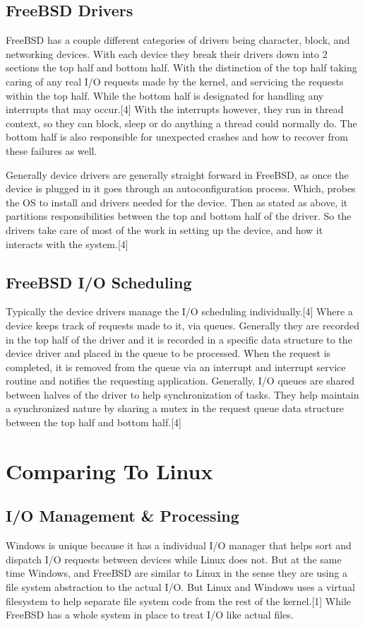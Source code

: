\documentclass[10pt,conference,draftclsnofoot,onecolumn]{IEEEtran}
\begin{document}
\subsection{FreeBSD Drivers}
FreeBSD has a couple different categories of drivers being character, block, and networking devices. With each device they break their drivers down into 2 sections the top half and bottom half. With the distinction of the top half taking caring of any real I/O requests made by the kernel, and servicing the requests within the top half. While the bottom half is designated for handling any interrupts that may occur.[4] With the interrupts however, they run in thread context, so they can block, sleep or do anything a thread could normally do. The bottom half is also responsible for unexpected crashes and how to recover from these failures as well.

Generally device drivers are generally straight forward in FreeBSD, as once the device is plugged in it goes through an autoconfiguration process. Which, probes the OS to install and drivers needed for the device. Then as stated as above, it partitions responsibilities between the top and bottom half of the driver. So the drivers take care of most of the work in setting up the device, and how it interacts with the system.[4]

\subsection{FreeBSD I/O Scheduling}
Typically the device drivers manage the I/O scheduling individually.[4] Where a device keeps track of requests made to it, via queues. Generally they are recorded in the top half of the driver and it is recorded in a specific data structure to the device driver and placed in the queue to be processed. When the request is completed, it is removed from the queue via an interrupt and interrupt service routine and notifies the requesting application. Generally, I/O queues are shared between halves of the driver to help synchronization of tasks. They help maintain a synchronized nature by sharing a mutex in the request queue data structure between the top half and bottom half.[4]

\section{Comparing To Linux}
\subsection{I/O Management \& Processing}
    Windows is unique because it has a individual I/O manager that helps sort and dispatch I/O requests between devices while Linux does not. But at the same time Windows, and  FreeBSD are similar to Linux in the sense they are using a file system abstraction to the actual I/O. But Linux and Windows uses a virtual filesystem to help separate file system code from the rest of the kernel.[1] While FreeBSD has a whole system in place to treat I/O like actual files.
\end{document}
